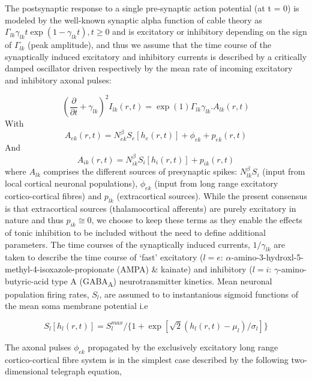 \documentclass[a4paper,12pt]{article}
\begin{document}
The postsynaptic response to a single pre-synaptic action potential (at
t = 0) is modeled by the well-known synaptic alpha function of cable
theory as $\Gamma_{lk} \gamma_{lk}t\exp(1-\gamma_{lk}t), t \geq 0$ and is excitatory or inhibitory depending
on the sign of $\Gamma_{lk}$ (peak amplitude), and thus we assume that the time
course of the synaptically induced excitatory and inhibitory currents is
described by a critically damped oscillator driven respectively by the
mean rate of incoming excitatory and inhibitory axonal pulses:

\begin{equation} \label{eq:i_lk}
\left( \frac{\partial}{\partial t} + \gamma_{lk} \right)^2 I_{lk}(r,t) = \exp(1)\Gamma_{lk}\gamma_{lk}.A_{lk}(r,t)
\end{equation}
\noindent
With
\begin{equation} \label{eq:a_ek}
A_{ek}(r,t) = N_{ek}^{\beta} S_e[ h_e(r,t)] + \phi_{ek} + p_{ek}(r,t)
\end{equation}
\noindent
And
\begin{equation} \label{eq:a_ik}
A_{ik}(r,t) = N_{ik}^{\beta} S_i[h_i(r,t)] + p_{ik}(r,t)
\end{equation}
\noindent
where $A_{lk}$ comprises the different sources of presynaptic spikes: $N_{lk}^\beta S_i$ (input from local cortical
neuronal populations), $\phi_{ek}$ (input from long range excitatory cortico-cortical fibres) and $p_{lk}$
(extracortical sources).
While the present consensus is that extracortical sources
(thalamocortical afferents) are purely excitatory in nature and thus $p_{ik} \cong 0$, we choose to keep these terms as
they enable the effects of
tonic inhibition to be included without the need to define additional
parameters. The time courses of the synaptically induced currents, $1 / \gamma_{lk}$ are taken to describe the time
course of ‘fast’ excitatory ($l = e$: $\alpha$-amino-3-hydroxl-5-methyl-4-isoxazole-propionate (AMPA) \& kainate) and
inhibitory ($l=i$: $\gamma$-amino-butyric-acid type A (GABA\textsubscript{A}) neurotransmitter kinetics. Mean neuronal
population firing rates, $S_l$, are assumed to to instantanious sigmoid functions of the mean soma membrane potential
i.e

\begin{equation} \label{eq:s_l}
S_l[h_l(r,t)]=S_l^{max}/\{1 + \exp[\sqrt{2}(h_l(r,t)-\mu_l)/\sigma_l]\}
\end{equation}

The axonal pulses $\phi_{ek}$ propagated by the exclusively excitatory long
range cortico-cortical fibre system is in the simplest case described by
the following two-dimensional telegraph equation,
\end{document}
